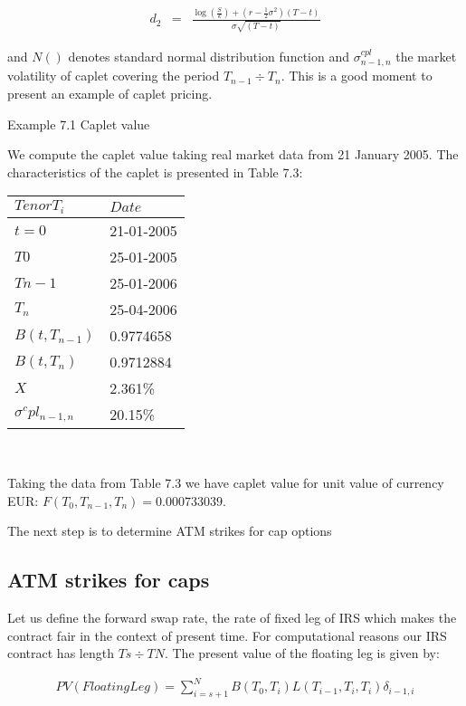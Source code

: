 \documentclass[11pt]{article}
\numberwithin{equation}{subsection}
\begin{document}
\begin{eqnarray*}
	d_2&=&\frac{\log(\frac{S}{k})+(r-\frac{1}{2}\sigma^2)(T-t)}{\sigma\sqrt{(T-t)}}
\end{eqnarray*}

and \(N()\) denotes standard normal distribution function and \(\sigma_{n-1, n}^{cpl}\) the market volatility of caplet
covering the period \(T_{n−1}÷T_{n}\). This is a good moment to present an example of caplet pricing.

Example 7.1 Caplet value

We compute the caplet value taking real market data from 21 January 2005. The characteristics
of the caplet is presented in Table 7.3:


\vskip 0.2cm 		
{
	\centering
	\begin{tabular}{|l|l|}
		\hline
		\(Tenor T_i\) & \(Date\) \\		
		\hline
		\(t=0\)   &  21-01-2005 \\
		\(T0\)    &  25-01-2005 \\
		\(Tn−1\)  &  25-01-2006 \\
		\(T_n\)   &  25-04-2006 \\
		\(B(t, T_{n−1})\)  &  0.9774658 \\
		\(B(t, T_{n})\)    &  0.9712884 \\
		\(X\)  			   &  2.361\%  \\
		\(\sigma^cpl_{n-1, n}\)  &  20.15\% \\
		\hline				 				
	\end{tabular}
}
\vskip 0.4cm\

Taking the data from Table 7.3 we have caplet value for unit value of currency EUR: \(F(T_{0}, T_{n-1}, T_{n})=0.000733039\).

The next step is to determine ATM strikes for cap options

\subsection{ATM strikes for caps}
Let us define the forward swap rate, the rate of fixed leg of IRS which makes the contract
fair in the context of present time. For computational reasons our IRS contract has length
\(Ts÷TN\). The present value of the floating leg is given by:

\begin{eqnarray*}
	PV(Floating Leg) = \sum_{i=s+1}^{N} B(T_0, T_{i}) L(T_{i-1}, T_{i}, T_{i}) \delta_{i−1,i} 
\end{eqnarray*}
\end{document}
